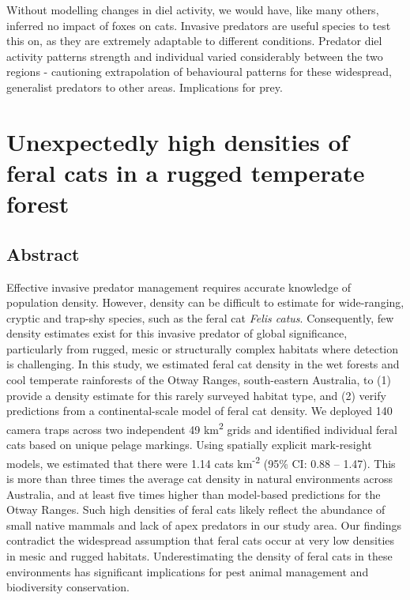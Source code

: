 \documentclass[11pt,a4paper,titlepage,twoside,openright]{style/unimelbthesis}
\begin{document}
\begin{mainmatter}
Without modelling changes in diel activity, we would have, like many others, inferred no impact of foxes on cats. Invasive predators are useful species to test this on, as they are extremely adaptable to different conditions. Predator diel activity patterns strength and individual varied considerably between the two regions - cautioning extrapolation of behavioural patterns for these widespread, generalist predators to other areas. Implications for prey.

\hypertarget{otways17}{%
\chapter{Unexpectedly high densities of feral cats in a rugged temperate forest}\label{otways17}}

\hypertarget{abstract-2}{%
\section*{Abstract}\label{abstract-2}}

Effective invasive predator management requires accurate knowledge of population density. However, density can be difficult to estimate for wide-ranging, cryptic and trap-shy species, such as the feral cat \emph{Felis catus}. Consequently, few density estimates exist for this invasive predator of global significance, particularly from rugged, mesic or structurally complex habitats where detection is challenging. In this study, we estimated feral cat density in the wet forests and cool temperate rainforests of the Otway Ranges, south-eastern Australia, to (1) provide a density estimate for this rarely surveyed habitat type, and (2) verify predictions from a continental-scale model of feral cat density. We deployed 140 camera traps across two independent 49 km\textsuperscript{2} grids and identified individual feral cats based on unique pelage markings. Using spatially explicit mark-resight models, we estimated that there were 1.14 cats km\textsuperscript{-2} (95\% CI: 0.88 -- 1.47). This is more than three times the average cat density in natural environments across Australia, and at least five times higher than model-based predictions for the Otway Ranges. Such high densities of feral cats likely reflect the abundance of small native mammals and lack of apex predators in our study area. Our findings contradict the widespread assumption that feral cats occur at very low densities in mesic and rugged habitats. Underestimating the density of feral cats in these environments has significant implications for pest animal management and biodiversity conservation.


\end{mainmatter}
\end{document}
